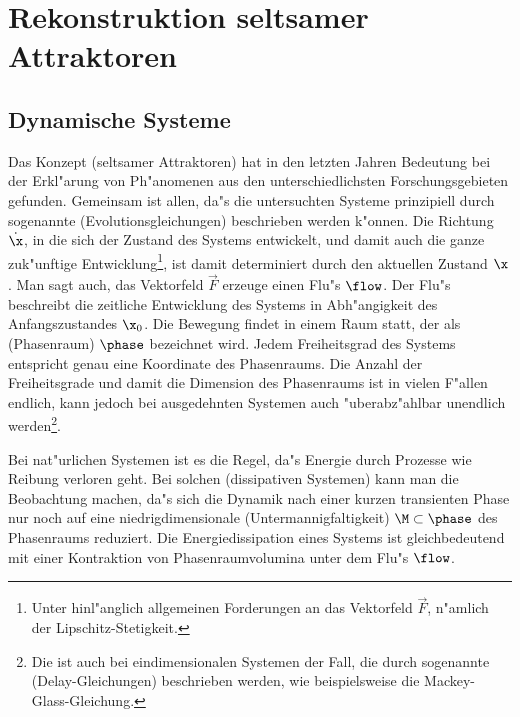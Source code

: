 \chapter{Rekonstruktion seltsamer Attraktoren}



\section{Dynamische Systeme}
\label{chapdynsystems}
Das Konzept \begriff(seltsamer Attraktoren) hat in den letzten Jahren Bedeutung bei der
Erkl"arung von Ph"anomenen aus den unterschiedlichsten Forschungsgebieten gefunden. Gemeinsam
ist allen, da"s die untersuchten Systeme prinzipiell durch sogenannte
\begriff(Evolutionsgleichungen)
beschrieben werden k"onnen. Die Richtung $\dot\x$, in die sich der Zustand des Systems entwickelt, und damit
auch die ganze zuk"unftige Entwicklung\footnote{Unter hinl"anglich allgemeinen Forderungen
an das Vektorfeld $\vec F$, n"amlich der Lipschitz-Stetigkeit.}, ist damit determiniert durch
den aktuellen Zustand $\x$. Man sagt auch, das Vektorfeld $\vec F$ erzeuge einen Flu"s
$\flow$.
Der Flu"s beschreibt die zeitliche Entwicklung des Systems in Abh"angigkeit des
Anfangszustandes $\x_0$.
Die Bewegung findet in einem Raum statt, der als \begriff(Phasenraum) $\phase$
bezeichnet wird. Jedem  Freiheitsgrad des Systems entspricht genau eine Koordinate des
Phasenraums. Die Anzahl der Freiheitsgrade und damit die Dimension des Phasenraums ist in
vielen F"allen endlich, kann jedoch bei ausgedehnten Systemen auch "uberabz"ahlbar
unendlich werden\footnote{Die ist auch bei eindimensionalen Systemen der Fall, die durch
sogenannte \begriff(Delay-Gleichungen) beschrieben werden, wie beispielsweise die
Mackey-Glass-Gleichung. }.


Bei nat"urlichen Systemen ist es die Regel, da"s Energie durch Prozesse wie Reibung
verloren geht. Bei solchen \begriff(dissipativen Systemen) kann man die Beobachtung
machen, da"s sich die Dynamik nach einer kurzen transienten Phase nur noch auf eine 
niedrigdimensionale \begriff(Untermannigfaltigkeit) $\M\subset\phase$ des Phasenraums
reduziert. Die Energiedissipation eines Systems ist gleichbedeutend mit einer Kontraktion
von Phasenraumvolumina unter dem Flu"s $\flow$.

